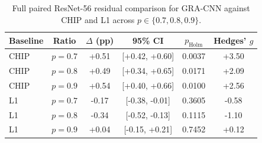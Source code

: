 \begin{table}[t]
\caption{Full paired ResNet-56 residual comparison for GRA-CNN against CHIP and L1 across $p\in\{0.7,0.8,0.9\}$.}
\label{tab:residual_paired_full_ivc}
\scriptsize
\begin{tabular*}{\linewidth}{@{\extracolsep\fill}lccccc}
\toprule
Baseline & Ratio & $\Delta$ (pp) & 95\% CI & $p_{\mathrm{Holm}}$ & Hedges' $g$ \\
\midrule
CHIP & $p=0.7$ & +0.51 & [+0.42, +0.60] & 0.0037 & +3.50 \\
CHIP & $p=0.8$ & +0.49 & [+0.34, +0.65] & 0.0171 & +2.09 \\
CHIP & $p=0.9$ & +0.54 & [+0.40, +0.66] & 0.0100 & +2.56 \\
L1 & $p=0.7$ & -0.17 & [-0.38, -0.01] & 0.3605 & -0.58 \\
L1 & $p=0.8$ & -0.34 & [-0.52, -0.13] & 0.1115 & -1.10 \\
L1 & $p=0.9$ & +0.04 & [-0.15, +0.21] & 0.7452 & +0.12 \\
\bottomrule
\end{tabular*}
\end{table}

